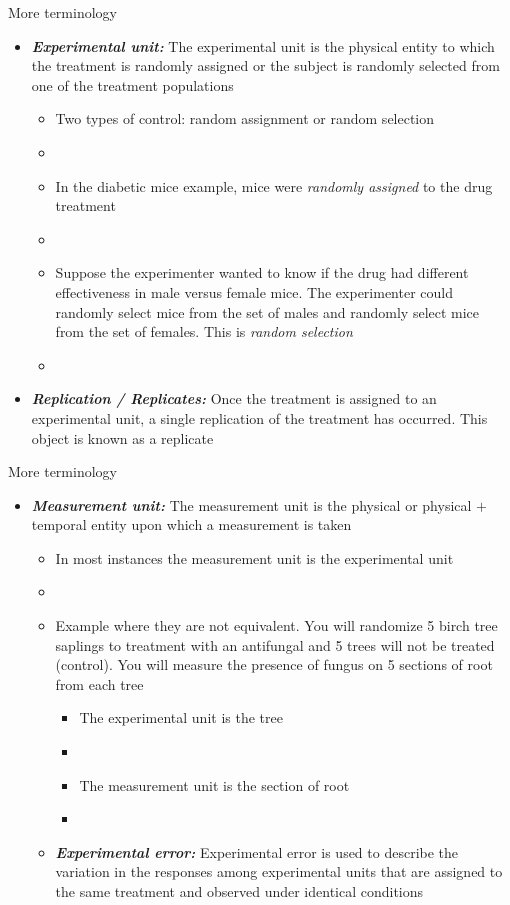 \documentclass[xcolor=dvipsnames]{beamer}
\begin{document}
\begin{frame}{More terminology}
	\begin{itemize}
		\item \textbf{\emph{Experimental unit:}} The experimental unit is the physical entity to which the treatment is randomly assigned or the subject is randomly selected from one of the treatment populations \pause
		\begin{itemize}
			\item Two types of control: random assignment or random selection \pause
			\item[]
			\item In the diabetic mice example, mice were \emph{randomly assigned} to the drug treatment \pause
			\item[]
			\item Suppose the experimenter wanted to know if the drug had different effectiveness in male versus female mice. The experimenter could randomly select mice from the set of males and randomly select mice from the set of females. This is \emph{random selection} \pause
			\item[]
		\end{itemize}
	\item \textbf{\emph{Replication / Replicates:}} Once the treatment is assigned to an experimental unit, a single replication of the treatment has occurred. This object is known as a replicate
	\end{itemize}
\end{frame}

\begin{frame}{More terminology}
	\begin{itemize}
		\item \textbf{\emph{Measurement unit:}} The measurement unit is the physical or physical $+$ temporal entity upon which a measurement is taken \pause
		\begin{itemize}
			\item In most instances the measurement unit is the experimental unit \pause
			\item[]
			\item Example where they are not equivalent.  You will randomize 5 birch tree saplings to treatment with an antifungal and 5 trees will not be treated (control). You will measure the presence of fungus on 5 sections of root from each tree \pause
			\begin{itemize}
				\item The experimental unit is the tree \pause
				\item[]
				\item The measurement unit is the section of root \pause
				\item[]
			\end{itemize}
			\item \textbf{\emph{Experimental error:}} Experimental error is used to describe the variation in the responses among experimental units that are assigned to the same treatment and observed under identical conditions
		\end{itemize}
	\end{itemize}
\end{frame}
\end{document}
